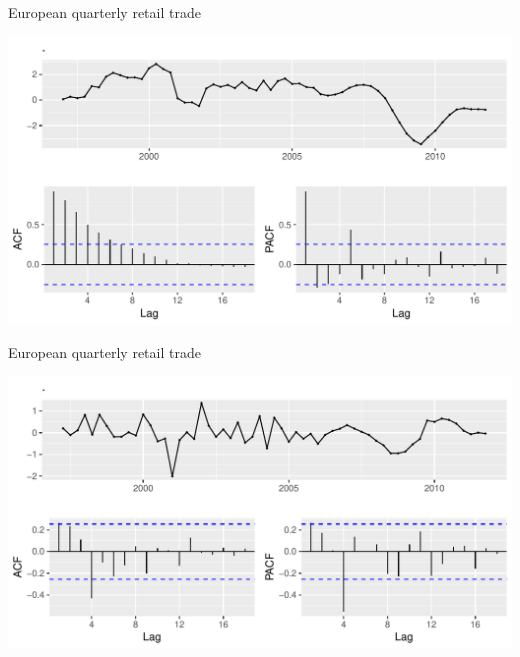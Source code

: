 \documentclass[14pt,ignorenonframetext,]{beamer}
\newenvironment{Shaded}{\begin{snugshade}}{\end{snugshade}}
\newcommand{\KeywordTok}[1]{\textcolor[rgb]{0.13,0.29,0.53}{\textbf{#1}}}
\newcommand{\DataTypeTok}[1]{\textcolor[rgb]{0.13,0.29,0.53}{#1}}
\newcommand{\DecValTok}[1]{\textcolor[rgb]{0.00,0.00,0.81}{#1}}
\newcommand{\StringTok}[1]{\textcolor[rgb]{0.31,0.60,0.02}{#1}}
\newcommand{\OperatorTok}[1]{\textcolor[rgb]{0.81,0.36,0.00}{\textbf{#1}}}
\newcommand{\NormalTok}[1]{#1}
\begin{document}
\begin{frame}[fragile]{European quarterly retail trade}

\begin{Shaded}
\end{Shaded}

\includegraphics{week_5_arima_files/figure-beamer/unnamed-chunk-43-1.pdf}

\end{frame}

\begin{frame}[fragile]{European quarterly retail trade}

\begin{Shaded}
\end{Shaded}

\includegraphics{week_5_arima_files/figure-beamer/unnamed-chunk-44-1.pdf}

\end{frame}
\end{document}
